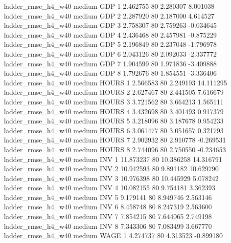  ladder_rmse_h4_w40     medium      GDP                 1  2.462755 80       2.280307           8.001038
 ladder_rmse_h4_w40     medium      GDP                 2  2.287920 80       2.187000           4.614527
 ladder_rmse_h4_w40     medium      GDP                 3  2.758307 80       2.759263          -0.034645
 ladder_rmse_h4_w40     medium      GDP                 4  2.436468 80       2.457981          -0.875229
 ladder_rmse_h4_w40     medium      GDP                 5  2.196849 80       2.237048          -1.796978
 ladder_rmse_h4_w40     medium      GDP                 6  2.043126 80       2.092033          -2.337772
 ladder_rmse_h4_w40     medium      GDP                 7  1.904599 80       1.971836          -3.409888
 ladder_rmse_h4_w40     medium      GDP                 8  1.792676 80       1.854551          -3.336406
 ladder_rmse_h4_w40     medium    HOURS                 1  2.566583 80       2.249193          14.111295
 ladder_rmse_h4_w40     medium    HOURS                 2  2.627467 80       2.441505           7.616679
 ladder_rmse_h4_w40     medium    HOURS                 3  3.721562 80       3.664213           1.565111
 ladder_rmse_h4_w40     medium    HOURS                 4  3.432698 80       3.401493           0.917379
 ladder_rmse_h4_w40     medium    HOURS                 5  3.218096 80       3.187678           0.954233
 ladder_rmse_h4_w40     medium    HOURS                 6  3.061477 80       3.051657           0.321793
 ladder_rmse_h4_w40     medium    HOURS                 7  2.902932 80       2.910778          -0.269531
 ladder_rmse_h4_w40     medium    HOURS                 8  2.744096 80       2.750550          -0.234653
 ladder_rmse_h4_w40     medium      INV                 1 11.873237 80      10.386258          14.316791
 ladder_rmse_h4_w40     medium      INV                 2 10.942593 80       9.891182          10.629790
 ladder_rmse_h4_w40     medium      INV                 3 10.976398 80      10.445929           5.078242
 ladder_rmse_h4_w40     medium      INV                 4 10.082155 80       9.754181           3.362393
 ladder_rmse_h4_w40     medium      INV                 5  9.179141 80       8.949746           2.563146
 ladder_rmse_h4_w40     medium      INV                 6  8.458748 80       8.247319           2.563600
 ladder_rmse_h4_w40     medium      INV                 7  7.854215 80       7.644065           2.749198
 ladder_rmse_h4_w40     medium      INV                 8  7.343306 80       7.083499           3.667770
 ladder_rmse_h4_w40     medium     WAGE                 1  4.274737 80       4.313523          -0.899180
